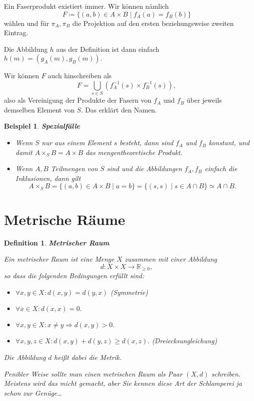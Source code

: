 \documentclass[12pt]{scrbook}   %
\newtheorem{definiX}[alles]{Definition}
\newenvironment{defini}[1]{\begin{definiX}{\bf #1}\par\rm}{\end{definiX}}
\newtheorem{bspX}[alles]{Beispiel}
\newenvironment{bsp}[1]{\begin{bspX}{\bf #1}\par\rm}{\end{bspX}}
\newcommand{\da}{\coloneqq}
\begin{document}
\medskip

Ein Faserprodukt existiert immer. Wir können nämlich 
$$F\da\{(a,b)\in A\times B \mid f_A(a) = f_B(b)\} $$
wählen und für $\pi_A,\pi_B$ die Projektion auf den ersten beziehungsweise
zweiten Eintrag. 

Die Abbildung $h$ aus der Definition ist dann einfach $h(m) = (g_A(m), g_B(m)).$

Wir können $F$ auch hinschreiben als 
$$F=\bigcup_{s\in S} \left(f_A^{-1}(s) \times f_B^{-1}(s)\right),$$
also als Vereinigung der Produkte der Fasern von $f_A$ und $f_B$ über jeweils
demselben Element von $S.$ Das erklärt den Namen.

\begin{bsp} {\bf Spezialfälle}

{\rm 
\begin{itemize}
\item[a)] Wenn $S$ nur aus einem Element $s$ besteht, dann sind $f_A$ und $f_B$
konstant, und damit $A\times_SB = A\times B$ das mengentheoretische Produkt.
\item[b)] Wenn $A,B$ Teilmengen von $S$ sind und die Abbildungen $f_A,f_B$ 
einfach die Inklusionen, dann gilt
$$A\times_SB = \{(a,b)\in A\times B\mid a=b\} = \{(s,s)\mid s\in A\cap B\} 
\simeq A\cap B.$$
\end{itemize}
}
\end{bsp}

\section{Metrische Räume}

\begin{defini} {\bf Metrischer Raum} 

{\rm Ein {\it metrischer Raum} ist eine Menge $X$ 
zusammen mit einer Abbildung $$d:X\times X\longrightarrow \mathbb R_{\geq 0},$$
so dass die folgenden Bedingungen erfüllt sind:
\begin{itemize}
\item $\forall x,y\in X: d(x,y) = d(y,x)$ (Symmetrie)
\item $\forall x\in X: d(x,x) = 0.$
\item $\forall x,y\in X: x\neq y\Rightarrow d(x,y) >0.$
\item $\forall x,y,z\in X: d(x,y) + d(y,z) \geq d(x,z).$ (Dreiecksungleichung)
\end{itemize}
Die Abbildung $d$ heißt dabei die {\it Metrik}.

Penibler Weise sollte man einen metrischen Raum als Paar $(X,d)$ schreiben.
Meistens wird das micht gemacht, aber Sie kennen diese Art der Schlamperei ja
schon zur Genüge\ldots
}\end{defini}
\end{document}
